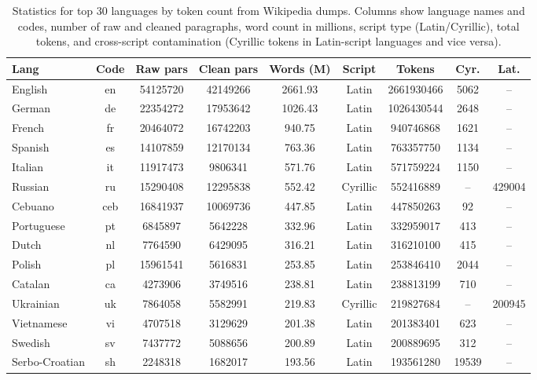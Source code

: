 \documentclass[11pt]{article}
\begin{document}
\begin{table}[ht]
    \caption{Statistics for top 30 languages by token count from Wikipedia dumps. Columns show language names and codes, number of raw and cleaned paragraphs, word count in millions, script type (Latin/Cyrillic), total tokens, and cross-script contamination (Cyrillic tokens in Latin-script languages and vice versa).}
    \label{tab:data_stats}
    \centering
    \small
    \renewcommand{\arraystretch}{1.1}
    \begin{tabular}{l c c c c c c c c}
        \toprule
        \textbf{Lang} & \textbf{Code} & \textbf{Raw pars} & \textbf{Clean pars} & \textbf{Words (M)} & \textbf{Script} & \textbf{Tokens} & \textbf{Cyr.} & \textbf{Lat.} \\
        \midrule
        English & en & 54125720 & 42149266 & 2661.93 & Latin & 2661930466 & 5062 & -- \\
        German & de & 22354272 & 17953642 & 1026.43 & Latin & 1026430544 & 2648 & -- \\
        French & fr & 20464072 & 16742203 & 940.75 & Latin & 940746868 & 1621 & -- \\
        Spanish & es & 14107859 & 12170134 & 763.36 & Latin & 763357750 & 1134 & -- \\
        Italian & it & 11917473 & 9806341 & 571.76 & Latin & 571759224 & 1150 & -- \\
        Russian & ru & 15290408 & 12295838 & 552.42 & Cyrillic & 552416889 & -- & 429004 \\
        Cebuano & ceb & 16841937 & 10069736 & 447.85 & Latin & 447850263 & 92 & -- \\
        Portuguese & pt & 6845897 & 5642228 & 332.96 & Latin & 332959017 & 413 & -- \\
        Dutch & nl & 7764590 & 6429095 & 316.21 & Latin & 316210100 & 415 & -- \\
        Polish & pl & 15961541 & 5616831 & 253.85 & Latin & 253846410 & 2044 & -- \\
        Catalan & ca & 4273906 & 3749516 & 238.81 & Latin & 238813199 & 710 & -- \\
        Ukrainian & uk & 7864058 & 5582991 & 219.83 & Cyrillic & 219827684 & -- & 200945 \\
        Vietnamese & vi & 4707518 & 3129629 & 201.38 & Latin & 201383401 & 623 & -- \\
        Swedish & sv & 7437772 & 5088656 & 200.89 & Latin & 200889695 & 312 & -- \\
        Serbo-Croatian & sh & 2248318 & 1682017 & 193.56 & Latin & 193561280 & 19539 & -- \\

\end{tabular}
\end{table}
\end{document}
